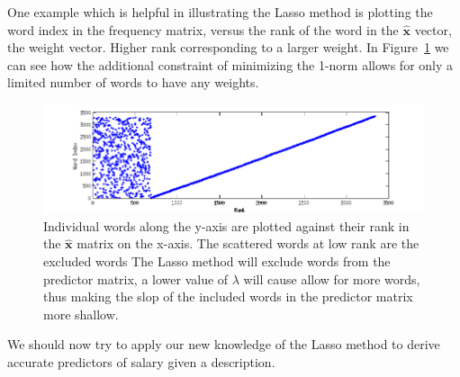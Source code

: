 \documentclass[12pt]{article}
\begin{document}
    One example which is helpful in illustrating the Lasso method is plotting
    the word index in the frequency matrix, versus the rank of the word in the
    $\bm{\hat{x}}$ vector, the weight vector. Higher rank corresponding to a
    larger weight. In Figure~\ref{fig:lasso} we can see how the additional
    constraint of minimizing the 1-norm allows for only a limited number of
    words to have any weights.
    
    \begin{figure}
        \begin{center}
        
            \includegraphics[width=\linewidth]{lasso_xhat.png}

            \caption{\label{fig:lasso} Individual words along the y-axis are
                plotted against their rank in the $\bm{\hat{x}}$ matrix on the
                x-axis. The scattered words at low rank are the excluded words
                The Lasso method will exclude words from the predictor matrix,
            a lower value of $\lambda$ will cause allow for more words, thus
        making the slop of the included words in the predictor matrix more
    shallow.}

        \end{center}
    \end{figure}

    We should now try to apply our new knowledge of the Lasso method to derive
    accurate predictors of salary given a description.
\end{document}
